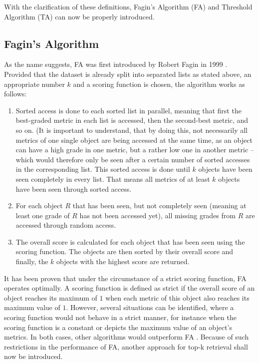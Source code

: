 With the clarification of these definitions, Fagin’s Algorithm (FA) and Threshold Algorithm (TA) can now be properly introduced.



\subsection{Fagin's Algorithm}

As the name suggests, FA was first introduced by Robert Fagin in 1999 \cite{fagin1999}. Provided that the dataset is already split into separated lists as stated above, an appropriate number $k$ and a scoring function is chosen, the algorithm works as follows:

\begin{enumerate}

\item Sorted access is done to each sorted list in parallel, meaning that first the best-graded metric in each list is accessed, then the second-best metric, and so on. (It is important to understand, that by doing this, not necessarily all metrics of one single object are being accessed at the same time, as an object can have a high grade in one metric, but a rather low one in another metric – which would therefore only be seen after a certain number of sorted accesses in the corresponding list. This sorted access is done until $k$ objects have been seen completely in every list. That means all metrics of at least $k$ objects have been seen through sorted access. 

\item For each object $R$ that has been seen, but not completely seen (meaning at least one grade of $R$ has not been accessed yet), all missing grades from $R$ are accessed through random access. 

\item The overall score is calculated for each object that has been seen using the scoring function. The objects are then sorted by their overall score and finally, the $k$ objects with the highest score are returned. 

\end{enumerate}

It has been proven that under the circumstance of a strict scoring function, FA operates optimally. A scoring function is defined as strict if the overall score of an object reaches its maximum of $1$ when each metric of this object also reaches its maximum value of $1$. However, several situations can be identified, where a scoring function would not behave in a strict manner, for instance when the scoring function is a constant or depicts the maximum value of an object’s metrics. In both cases, other algorithms would outperform FA \cite{fagin2002}. Because of such restrictions in the performance of FA, another approach for top-k retrieval shall now be introduced.


